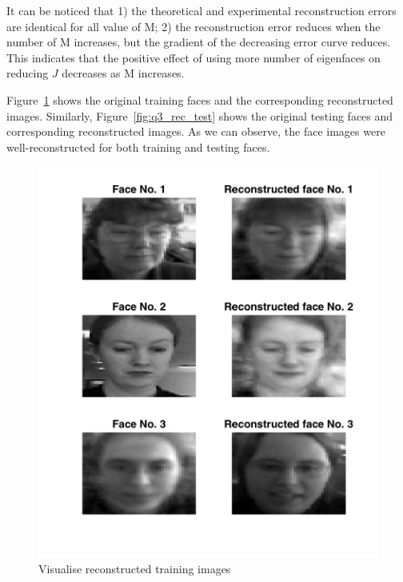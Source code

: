 \documentclass[10pt,twocolumn,letterpaper]{article}
\begin{document}
It can be noticed that 1) the theoretical and experimental reconstruction errors are identical for all value of M; 2) the reconstruction error reduces when the number of M increases, but the gradient of the decreasing error curve reduces. This indicates that the positive effect of using more number of eigenfaces on reducing $J$ decreases as M increases. 

Figure~\ref{fig:q3_rec_train} shows the original training faces and the corresponding reconstructed images. Similarly, Figure~\ref{fig:q3_rec_test} shows the original testing faces and corresponding reconstructed images. As we can observe, the face images were well-reconstructed for both training and testing faces.
	
	\begin{figure}
		\begin{center}
			\includegraphics[width=1\linewidth]{q3_rec_train}
			\caption{Visualise reconstructed training images}
			\label{fig:q3_rec_train}
		\end{center}
	\end{figure}
	
\end{document}
